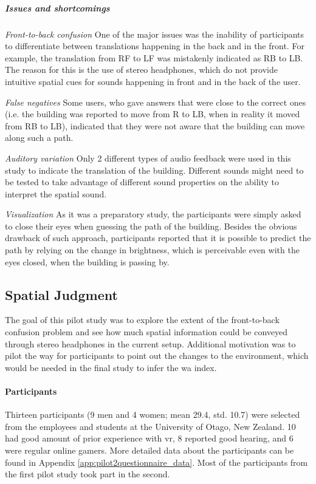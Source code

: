 \subparagraph{Issues and shortcomings} \hfill

\textit{Front-to-back confusion} One of the major issues was the inability of participants to differentiate between translations happening in the back and in the front. For example, the translation from RF to LF was mistakenly indicated as RB to LB. The reason for this is the use of stereo headphones, which do not provide intuitive spatial cues for sounds happening in front and in the back of the user.

\textit{False negatives} Some users, who gave answers that were close to the correct ones (i.e. the building was reported to move from R to LB, when in reality it moved from RB to LB), indicated that they were not aware that the building can move along such a path.

\textit{Auditory variation} Only 2 different types of audio feedback were used in this study to indicate the translation of the building. Different sounds might need to be tested to take advantage of different sound properties on the ability to interpret the spatial sound. 

\textit{Visualization} As it was a preparatory study, the participants were simply asked to close their eyes when guessing the path of the building. Besides the obvious drawback of such approach, participants reported that it is possible to predict the path by relying on the change in brightness, which is perceivable even with the eyes closed, when the building is passing by.











\subsection{Spatial Judgment}
\label{study_two}
The goal of this pilot study was to explore the extent of the front-to-back confusion problem and see how much spatial information could be conveyed through stereo headphones in the current setup. Additional motivation was to pilot the way for participants to point out the changes to the environment, which would be needed in the final study to infer the \gls{wa} index. 

\paragraph{Participants}
Thirteen participants (9 men and 4 women; mean 29.4, std. 10.7) were selected from the employees and students at the University of Otago, New Zealand. 10 had good amount of prior experience with \gls{vr}, 8 reported good hearing, and 6 were regular online gamers. More detailed data about the participants can be found in Appendix \ref{app:pilot2questionnaire_data}. Most of the participants from the first pilot study took part in the second.

